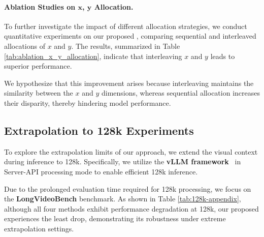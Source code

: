 \paragraph{Ablation Studies on \(\mathbf{x}\), \(\mathbf{y}\) Allocation.} \label{app:x_y_allocation}
To further investigate the impact of different allocation strategies, we conduct quantitative experiments on our proposed \textbf{\methodname}, comparing sequential and interleaved allocations of $x$ and $y$. The results, summarized in Table \ref{tab:ablation_x_y_allocation}, indicate that interleaving $x$ and $y$ leads to superior performance. 


We hypothesize that this improvement arises because interleaving maintains the similarity between the $x$ and $y$ dimensions, whereas sequential allocation increases their disparity, thereby hindering model performance.  


\subsection{Extrapolation to 128k Experiments}
To explore the extrapolation limits of our approach, we extend the visual context during inference to 128k. Specifically, we utilize the \textbf{vLLM framework}~\cite{kwon2023efficient} in Server-API processing mode to enable efficient 128k inference.  

Due to the prolonged evaluation time required for 128k processing, we focus on the \textbf{LongVideoBench} benchmark. As shown in Table \ref{tab:128k-appendix}, although all four methods exhibit performance degradation at 128k, our proposed \textbf{\methodname} experiences the least drop, demonstrating its robustness under extreme extrapolation settings.  




